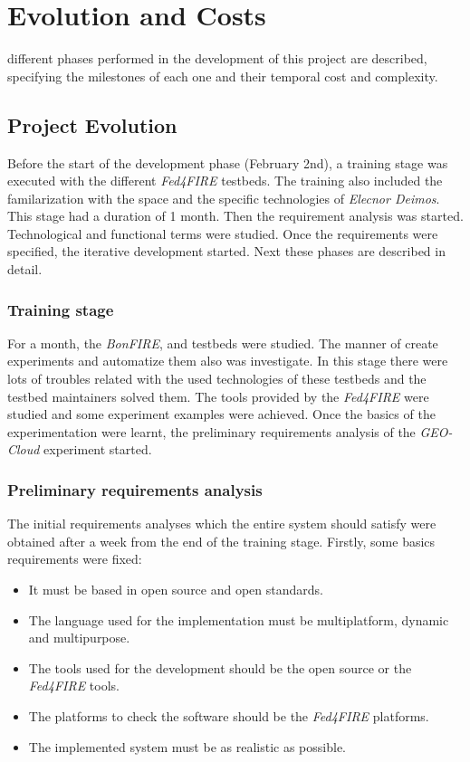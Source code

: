\chapter{Evolution and Costs}
\label{chap:evolution}
 different phases performed in the development of this project are described,
specifying the milestones of each one and their temporal cost and complexity.


\section{Project Evolution}
\label{section:evolution}

Before the start of the development phase (February 2nd), a training stage was
executed with
the different \emph{Fed4FIRE} testbeds. The training also included the familarization
with the space and the specific technologies of \emph{Elecnor Deimos}. This
stage had a duration of 1 month. Then the
requirement analysis was started. Technological and functional terms were
studied. Once the requirements were specified, the iterative
development started. Next these phases are described in detail.

\subsection{Training stage}
For a month, the \emph{BonFIRE}, \pl and \vw testbeds were studied. The manner
of create experiments and automatize them also was investigate. In this stage there
were lots of troubles related with the used technologies of these testbeds and
the testbed maintainers solved them.
The tools provided by the \emph{Fed4FIRE} were studied and some experiment
examples were achieved. Once the basics of the experimentation were learnt, the
preliminary requirements analysis of the \emph{GEO-Cloud} experiment started.


\subsection{Preliminary requirements analysis}

The initial requirements analyses which the entire system should satisfy were
obtained after a week from the end of the training stage.
Firstly, some basics requirements were fixed:

\begin{itemize}
\item It must be based in open source and open standards.
\item The language used for the implementation must be multiplatform, dynamic
  and multipurpose.
\item The tools used for the development should be the open source or the \emph{Fed4FIRE} tools.
\item The platforms to check the software should be the \emph{Fed4FIRE}
  platforms.
\item The implemented system must be as realistic as possible.
\end{itemize}

